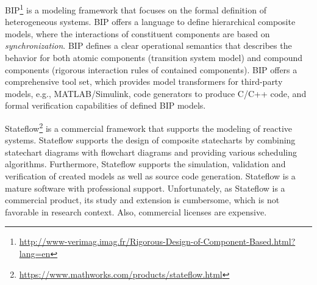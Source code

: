 BIP\footnote{\url{http://www-verimag.imag.fr/Rigorous-Design-of-Component-Based.html?lang=en}} \cite{bip,bip3} is a modeling framework that focuses on the formal definition of heterogeneous systems.
BIP offers a language to define hierarchical composite models, where the interactions of constituent components are based on \emph{synchronization}. BIP defines a clear operational semantics that describes the behavior for both atomic components (transition system model) and compound components (rigorous interaction rules of contained components). BIP offers a comprehensive tool set, which provides model transformers for third-party models, e.g., MATLAB/Simulink, code generators to produce C/C++ code, and formal
verification capabilities of defined BIP models.

Stateflow\footnote{\url{https://www.mathworks.com/products/stateflow.html}} \cite{stateflow} is a commercial framework that supports the modeling of
reactive systems. Stateflow supports the design of composite
statecharts by combining
statechart diagrams with flowchart diagrams and providing various scheduling
algorithms. Furthermore, Stateflow supports the simulation, validation and verification of created models as well as source code generation. Stateflow is a mature software with professional
support. Unfortunately, as Stateflow is a commercial product, its study and extension is cumbersome, which is not favorable in research context. Also, commercial licenses are expensive.



